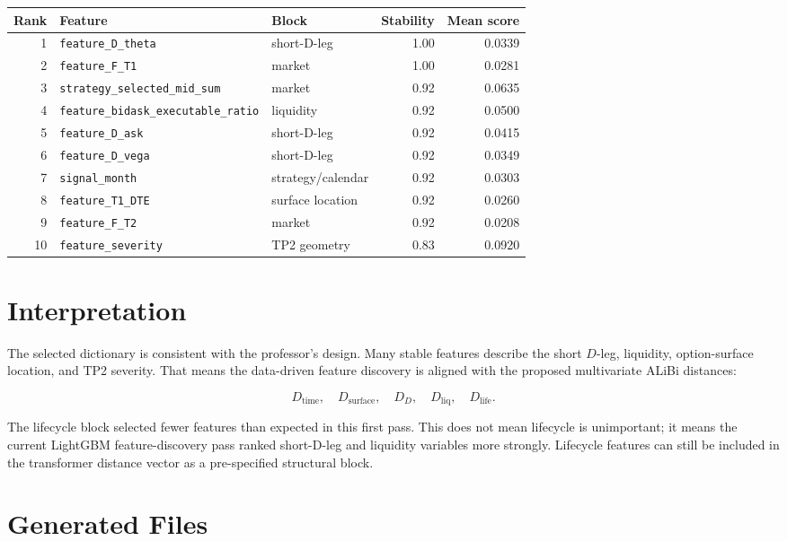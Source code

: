 \documentclass[11pt]{article}
\begin{document}
\begin{center}
\small
\begin{tabular}{rllrr}
\toprule
Rank & Feature & Block & Stability & Mean score \\
\midrule
1 & \texttt{feature\_D\_theta} & short-D-leg & 1.00 & 0.0339 \\
2 & \texttt{feature\_F\_T1} & market & 1.00 & 0.0281 \\
3 & \texttt{strategy\_selected\_mid\_sum} & market & 0.92 & 0.0635 \\
4 & \texttt{feature\_bidask\_executable\_ratio} & liquidity & 0.92 & 0.0500 \\
5 & \texttt{feature\_D\_ask} & short-D-leg & 0.92 & 0.0415 \\
6 & \texttt{feature\_D\_vega} & short-D-leg & 0.92 & 0.0349 \\
7 & \texttt{signal\_month} & strategy/calendar & 0.92 & 0.0303 \\
8 & \texttt{feature\_T1\_DTE} & surface location & 0.92 & 0.0260 \\
9 & \texttt{feature\_F\_T2} & market & 0.92 & 0.0208 \\
10 & \texttt{feature\_severity} & TP2 geometry & 0.83 & 0.0920 \\
\bottomrule
\end{tabular}
\normalsize
\end{center}

\section*{Interpretation}

The selected dictionary is consistent with the professor's design. Many stable
features describe the short \(D\)-leg, liquidity, option-surface location, and
TP2 severity. That means the data-driven feature discovery is aligned with the
proposed multivariate ALiBi distances:

\[
D_{\mathrm{time}},\quad
D_{\mathrm{surface}},\quad
D_D,\quad
D_{\mathrm{liq}},\quad
D_{\mathrm{life}}.
\]

The lifecycle block selected fewer features than expected in this first pass.
This does not mean lifecycle is unimportant; it means the current LightGBM
feature-discovery pass ranked short-D-leg and liquidity variables more strongly.
Lifecycle features can still be included in the transformer distance vector as a
pre-specified structural block.

\section*{Generated Files}
\end{document}

